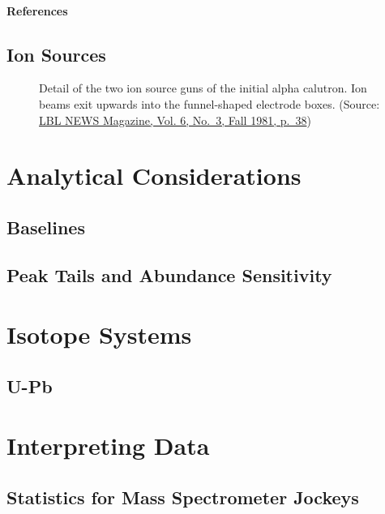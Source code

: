 \documentclass[
  letterpaper,
  DIV=11,
  numbers=noendperiod]{scrreprt}
\newlength{\cslhangindent}
\newenvironment{CSLReferences}[2] %
 {\begin{list}{}{%
  \setlength{\itemindent}{0pt}
  \setlength{\leftmargin}{0pt}
  \setlength{\parsep}{0pt}
  \ifodd #1
   \setlength{\leftmargin}{\cslhangindent}
   \setlength{\itemindent}{-1\cslhangindent}
  \fi
  \setlength{\itemsep}{#2\baselineskip}}}
 {\end{list}}
\begin{document}
\subsection{References}\label{references}

\label{refs}
\begin{CSLReferences}{0}{1}
\end{CSLReferences}

\chapter{Ion Sources}\label{ion-sources}

\begin{figure}

\centering{

}

\caption{\label{fig-calutron_tank}Detail of the two ion source guns of
the initial alpha calutron. Ion beams exit upwards into the
funnel-shaped electrode boxes. (Source:
\href{https://web.archive.org/web/20060929102724/http://imglib.lbl.gov/cgi-bin/ImgLib/displaytag/BERKELEY-LAB/ACCELERATORS/CALUTRONS/tags/96602761?both=small}{LBL
NEWS Magazine, Vol. 6, No.~3, Fall 1981, p.~38})}

\end{figure}%

\part{Analytical Considerations}

\chapter{Baselines}\label{baselines}

\chapter{Peak Tails and Abundance
Sensitivity}\label{peak-tails-and-abundance-sensitivity}

\part{Isotope Systems}

\chapter{U-Pb}\label{u-pb}

\part{Interpreting Data}

\chapter{Statistics for Mass Spectrometer
Jockeys}\label{statistics-for-mass-spectrometer-jockeys}
\end{document}
